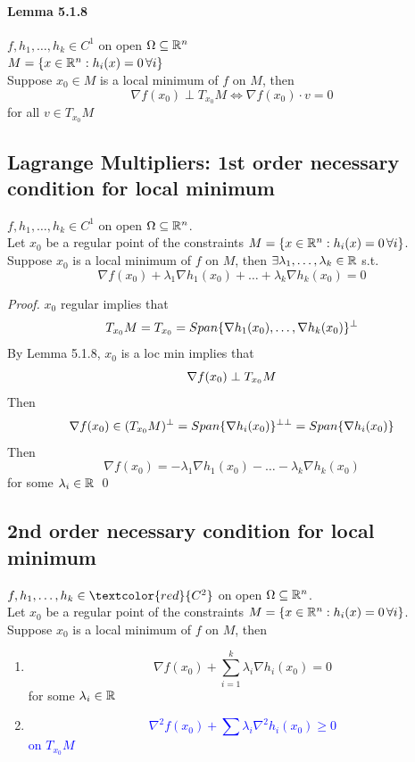 \documentclass[11pt]{article}
\begin{document}
\paragraph{Lemma 5.1.8}
$f, h_1, \hdots, h_k \in C^1$ on open $\Omega \subseteq \mathbb{R}^n$ \\
$ M = \{ x \in \mathbb{R}^n: h_i(x) = 0 \, \forall i\}$ \\
Suppose $x_0 \in M$ is a local minimum of $f$ on $M$, then
$$\nabla f(x_0) \perp T_{x_0}M \iff \nabla f(x_0)\cdot v = 0$$ for all $v \in T_{x_0}M$

\subsection{Lagrange Multipliers: 1st order necessary condition for local minimum}
$f, h_1, \hdots, h_k \in C^1$ on open $\Omega \subseteq \mathbb{R}^n$. \\
Let $x_0$ be a regular point of the constraints $ M = \{ x \in \mathbb{R}^n: h_i(x) = 0 \, \forall i\}$. \\
Suppose $x_0$ is a local minimum of $f$ on $M$, then $\exists \lambda_1, \hdots, \lambda_k \in \mathbb{R}$ s.t.
$$\nabla f(x_0) + \lambda_1 \nabla h_1(x_0) + \hdots + \lambda_k \nabla h_k(x_0) = 0$$
\begin{proof}
	$x_0$ regular implies that $$T_{x_0}M = T_{x_0} = Span\{\nabla h_1(x_0), \hdots, \nabla h_k(x_0)\}^\perp$$
	By Lemma 5.1.8, $x_0$ is a loc min implies that $$\nabla f(x_0) \perp T_{x_0}M$$
	Then $$\nabla f(x_0) \in (T_{x_0}M)^\perp = Span\{\nabla h_i (x_0)\}^{\perp\perp} = Span\{ \nabla h_i(x_0)\}$$
	Then 
	$$\nabla f(x_0) = -\lambda_1 \nabla h_1(x_0) - \hdots - \lambda_k \nabla h_k(x_0)$$
	for some $\lambda_i \in \mathbb{R}$ \qed
\end{proof} 

\subsection{2nd order necessary condition for local minimum}
$f, h_1, \hdots, h_k \in \textcolor{red}{C^2}$ on open $\Omega \subseteq \mathbb{R}^n$. \\
Let $x_0$ be a regular point of the constraints $ M = \{ x \in \mathbb{R}^n: h_i(x) = 0 \, \forall i\}$. \\
Suppose $x_0$ is a local minimum of $f$ on $M$, then
\begin{enumerate}
	\item $$\nabla f(x_0) + \sum_{i=1}^k \lambda_i \nabla h_i(x_0) = 0$$
	for some $\lambda_i \in \mathbb{R}$
	\item \textcolor{blue}{$$\nabla^2 f(x_0) + \sum \lambda_i \nabla^2 h_i(x_0) \geq 0$$ on $T_{x_0}M$}
\end{enumerate}
\end{document}
